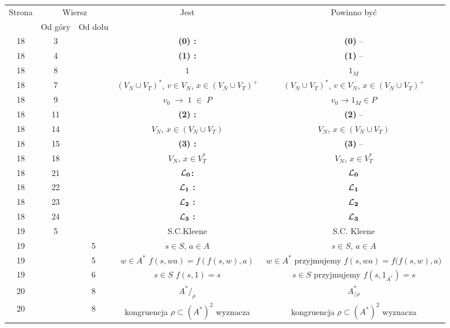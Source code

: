 \documentclass[a4paper,11pt]{article}
\begin{document}
\begin{center}
  \newpage

  \begin{tabular}{|c|c|c|c|c|}
    \hline
    Strona & \multicolumn{2}{c|}{Wiersz} & Jest
                              & Powinno być \\ \cline{2-3}
    & Od góry & Od dołu & & \\
    \hline
    18  &  3 & & \textbf{(0) :} & \textbf{(0)} -- \\
    18  &  4 & & \textbf{(1) :} & \textbf{(1)} -- \\
    18  &  8 & & $1$ & $1_{ M }$ \\
    18  &  7 & & $( V_{ N } \cup V_{ T } )^{ * }$,{ } $v \in V_{ N }$,{ }
                 $x \in ( V_{ N } \cup V_{ T } )^{ + }$
                 & $( V_{ N } \cup V_{ T } )^{ * }$, $v \in V_{ N }$,
                   $x \in ( V_{ N } \cup V_{ T } )^{ + }$ \\
    18  &  9 & & $v_{ 0 } \; \to \; 1 \; \in \; P$
    & $v_{ 0 } \to 1_{ M } \in P$ \\
    18  & 11 & & \textbf{(2) :} & \textbf{(2)} -- \\
    18  & 14 & & $V_{ N }$,{ } $x \in ( V_{ N } \cup V_{ T } )$
           & $V_{ N }$, $x \in ( V_{ N } \cup V_{ T } )$ \\
    18  & 15 & & \textbf{(3) :} & \textbf{(3)} -- \\
    18  & 18 & & $V_{ N }$,{ } $x \in V_{ T }^{ * }$
    & $V_{ N }$, $x \in V_{ T }^{ * }$ \\
    18  & 21 & & $\mathbf{\mathcal{L}_{ 0 }}$\textbf{:} & $\mathbf{\mathcal{L}_{ 0 }}$ \\
    18  & 22 & & $\mathbf{\mathcal{L}_{ 1 }}$ \textbf{:} & $\mathbf{\mathcal{L}_{ 1 }}$ \\
    18  & 23 & & $\mathbf{\mathcal{L}_{ 2 }}$ \textbf{:} & $\mathbf{\mathcal{L}_{ 2 }}$ \\
    18  & 24 & & $\mathbf{\mathcal{L}_{ 3 }}$ \textbf{:} & $\mathbf{\mathcal{L}_{ 3 }}$ \\
    19  &  5 & & S.C.Kleene & S.C. Kleene \\
    19  & &  5 & $s \in S$,{ } $a \in A$ & $s \in S$, $a \in A$ \\
    19  & &  5 & $w \in A^{ * }${ } $f( s, wa ) = f( f( s, w ), a )$
    &$w \in A^{ * }$ przyjmujemy $f( s, wa ) = f\big( f( s, w ), a \big)$ \\
    19  & &  6 & $s \in S${ } $f( s, 1 ) = s$
    & $s \in S$ przyjmujemy $f( s, 1_{ A^{ * } } ) = s$ \\
    20  & &  8 & $A^{ * } /_{ \rho }$ & $A^{ * }_{ / \rho }$ \\
    20  & &  8 & kongruencja{ }{ } $\rho \subset ( A^{ * } )^{ 2 }${ }{ } wyznacza
    & kongruencja $\rho \subset ( A^{ * } )^{ 2 }$ wyznacza \\
    \hline
  \end{tabular}






\end{center}
\end{document}
